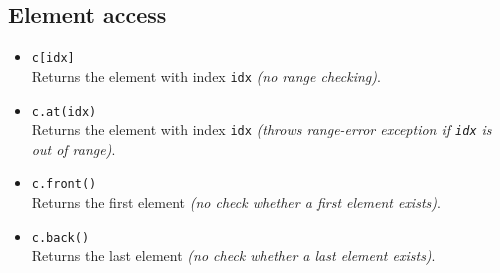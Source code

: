 \documentclass{report}
\begin{document}
\subsection{Element access}
\begin{itemize}
    \item \texttt{c[idx]} \\
          Returns the element with index \texttt{idx} \textit{(no range checking)}.
          
    \item \texttt{c.at(idx)} \\
          Returns the element with index \texttt{idx} \textit{(throws range-error exception if \texttt{idx} is out of range)}.
          
    \item \texttt{c.front()} \\
          Returns the first element \textit{(no check whether a first element exists)}.
          
    \item \texttt{c.back()} \\
          Returns the last element \textit{(no check whether a last element exists)}.
\end{itemize}

\pagebreak 
\end{document}
